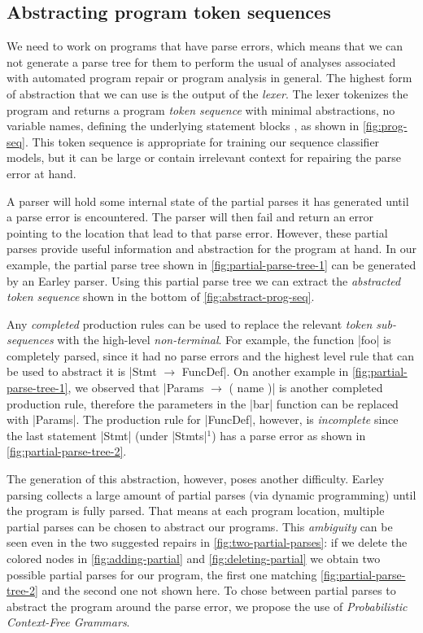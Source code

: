 \subsection{Abstracting program token sequences}
\label{sec:overview:abstraction}

We need to work on programs that have parse errors, which means that we can not
generate a parse tree for them to perform the usual of analyses associated with
automated program repair \citep{Sakkas_2020, Martinez_2013, Gulwani_2018,
Wang_2018} or program analysis in general.
%
The highest form of abstraction that we can use is the output of the
\emph{lexer}. The lexer tokenizes the program and returns a program \emph{token
sequence} with minimal abstractions, \eg no variable names, defining the
underlying statement blocks \etc, as shown in \autoref{fig:prog-seq}. This token
sequence is appropriate for training our sequence classifier models, but it can
be large or contain irrelevant context for repairing the parse error at hand.

A parser will hold some internal state of the partial parses it has
generated until a parse error is encountered. The parser will then fail and
return an error pointing to the location that lead to that parse error. However,
these partial parses provide useful information and abstraction for the program
at hand. In our example, the partial parse tree shown in
\autoref{fig:partial-parse-tree-1} can be generated by an Earley parser. Using
this partial parse tree we can extract the \emph{abstracted token sequence}
shown in the bottom of \autoref{fig:abstract-prog-seq}.

Any \emph{completed} production rules can be used to replace the relevant
\emph{token sub-sequences} with the high-level \emph{non-terminal}. For example,
the function |foo| is completely parsed, since it had no parse errors and the
highest level rule that can be used to abstract it is
%
|Stmt $\rightarrow$ FuncDef|. On another example in
\autoref{fig:partial-parse-tree-1}, we observed that
%
|Params $\rightarrow$ ( name )| is another completed production rule, therefore
the parameters in the |bar| function can be replaced with |Params|. The
production rule for |FuncDef|, however, is \emph{incomplete} since the last
statement |Stmt| (under |Stmts|$^1$) has a parse error as shown in
\autoref{fig:partial-parse-tree-2}.

The generation of this abstraction, however, poses another difficulty. Earley
parsing collects a large amount of partial parses (via dynamic programming)
until the program is fully parsed. That means at each program location, multiple
partial parses can be chosen to abstract our programs. This \emph{ambiguity} can
be seen even in the two suggested repairs in \autoref{fig:two-partial-parses}:
if we delete the colored nodes in \autoref{fig:adding-partial} and
\autoref{fig:deleting-partial} we obtain two possible partial parses for our
program, the first one matching \autoref{fig:partial-parse-tree-2} and the
second one not shown here. To chose between partial parses to abstract the
program around the parse error, we propose the use of \emph{Probabilistic
Context-Free Grammars}.


